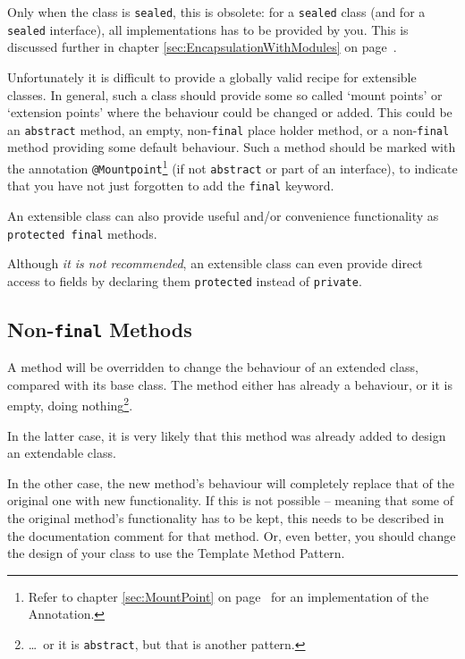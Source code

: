 \documentclass[11pt,a4paper, titlepage, parskip=half, headsepline, footsepline, cleardoublepage=current, headheight=1cm]{scrbook}
\newcommand*{\tqvref}[1]{\hyperref[{#1}]{\ref*{#1}} on page~\pageref{#1}}
\begin{document}
Only when the class is \lstinline|sealed|\autocite{ORACLE_DOC_LANGUAGE_SPECIFICATION:SealedClasses, ORACLE_DOC_LANGUAGE_SPECIFICATION:SealedInterfaces}, this is obsolete: for a \lstinline|sealed| class (and for a \lstinline|sealed| interface), all implementations has to be provided by you. This is discussed further in chapter \tqvref{sec:EncapsulationWithModules}.

Unfortunately it is difficult to provide a globally valid recipe for extensible classes. In general, such a class should provide some so called ‘mount points’ or ‘extension points’ where the behaviour could be changed or added. This could be an \lstinline|abstract| method, an empty, non-\lstinline|final| place holder method, or a non-\lstinline|final| method providing some default behaviour. Such a method should be marked with the annotation \lstinline|@Mountpoint|\footnote{Refer to chapter \tqvref{sec:MountPoint} for an implementation of the Annotation.} (if not \lstinline|abstract| or part of an interface), to indicate that you have not just forgotten to add the \lstinline|final| keyword.

An extensible class can also provide useful and/or convenience functionality as \lstinline|protected final| methods. 

Although \textit{it is not recommended}, an extensible class can even provide direct access to fields by declaring them \lstinline|protected| instead of \lstinline|private|.

\subsection{Non-\lstinline|final| Methods}\label{sec:NonFinalMethods}
A method will be overridden to change the behaviour of an extended class, compared with its base class. The method either has already a behaviour, or it is empty, doing nothing\footnote{…~or it is \lstinline|abstract|, but that is another pattern.}.

In the latter case, it is very likely that this method was already added to design an extendable class.

In the other case, the new method's behaviour will completely replace that of the original one with new functionality. If this is not possible – meaning that some of the original method's functionality has to be kept, this needs to be described in the documentation comment for that method. Or, even better, you should change the design of your class to use the Template Method Pattern\autocite{Gamma:DesignPatterns}.
\end{document}
